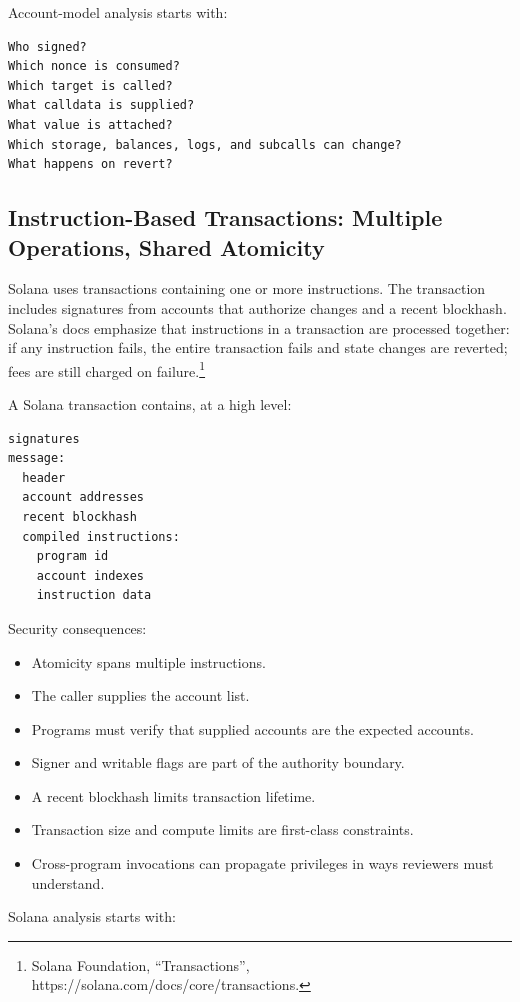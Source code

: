 Account-model analysis starts with:

\begin{lstlisting}
Who signed?
Which nonce is consumed?
Which target is called?
What calldata is supplied?
What value is attached?
Which storage, balances, logs, and subcalls can change?
What happens on revert?
\end{lstlisting}

\subsection{Instruction-Based Transactions: Multiple Operations, Shared
Atomicity}

Solana uses transactions containing one or more instructions. The
transaction includes signatures from accounts that authorize changes and
a recent blockhash. Solana's docs emphasize that instructions in a
transaction are processed together: if any instruction fails, the entire
transaction fails and state changes are reverted; fees are still charged
on failure.\footnote{Solana Foundation, ``Transactions'',
  https://solana.com/docs/core/transactions.}

A Solana transaction contains, at a high level:

\begin{lstlisting}
signatures
message:
  header
  account addresses
  recent blockhash
  compiled instructions:
    program id
    account indexes
    instruction data
\end{lstlisting}

Security consequences:

\begin{itemize}
\tightlist
\item
  Atomicity spans multiple instructions.
\item
  The caller supplies the account list.
\item
  Programs must verify that supplied accounts are the expected accounts.
\item
  Signer and writable flags are part of the authority boundary.
\item
  A recent blockhash limits transaction lifetime.
\item
  Transaction size and compute limits are first-class constraints.
\item
  Cross-program invocations can propagate privileges in ways reviewers
  must understand.
\end{itemize}

Solana analysis starts with:

